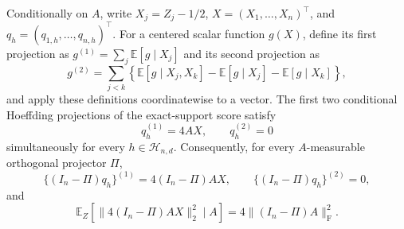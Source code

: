 Conditionally on \(A\), write \(X_j=Z_j-1/2\), \(X=(X_1,\ldots,X_n)^\top\), and \(q_h=(q_{1,h},\ldots,q_{n,h})^\top\).  For a centered scalar function \(g(X)\), define its first projection as \(g^{(1)}=\sum_j\mathbb E[g\mid X_j]\) and its second projection as
\[
 g^{(2)}=\sum_{j<k}\left\{\mathbb E[g\mid X_j,X_k]
 -\mathbb E[g\mid X_j]-\mathbb E[g\mid X_k]\right\},
\]
and apply these definitions coordinatewise to a vector.  The first two conditional Hoeffding projections of the exact-support score satisfy
\[
 q_h^{(1)}=4AX,\qquad q_h^{(2)}=0
\]
simultaneously for every \(h\in\mathcal H_{n,d}\).  Consequently, for every \(A\)-measurable orthogonal projector \(\Pi\),
\[
 \{(I_n-\Pi)q_h\}^{(1)}=4(I_n-\Pi)AX,
 \qquad \{(I_n-\Pi)q_h\}^{(2)}=0,
\]
and
\[
 \mathbb E_Z\!\left[\|4(I_n-\Pi)AX\|_2^2\mid A\right]
 =4\|(I_n-\Pi)A\|_{\mathrm F}^2.
\]